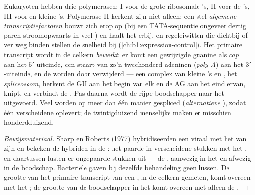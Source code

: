 \begin{proposition}\label{prop:b1:gene-expression:processing}
Eukaryoten hebben drie polymerasen: I voor de grote ribosomale 's, II voor de
's, III voor  en kleine 's. Polymerase II herkent
zijn  niet alleen: een stel \emph{algemene transcriptiefactoren} bouwt zich
erop op (bij een TATA-sequentie ongeveer dertig paren stroomopwaarts in veel )
en haalt het  erbij, en regeleiwitten die dichtbij of ver weg binden stellen
de snelheid bij (\cref{ch:b1:expression-control}). Het primaire transcript wordt in
de celkern \emph{bewerkt}: er komt een gewijzigde guanine als \emph{cap} aan het
$5'$-uiteinde, een staart van zo'n tweehonderd adeninen (\emph{poly-A}) aan het
$3'$-uiteinde, en de  worden door \emph{} verwijderd --- een
complex van kleine 's en , het \emph{spliceosoom}, herkent de GU aan het
begin van elk  en de AG aan het eind ervan, knipt, en verbindt de . Pas
daarna wordt de rijpe boodschapper naar het  uitgevoerd. Veel  worden
op meer dan één manier gespliced (\emph{alternatieve }), zodat één 
verscheidene  oplevert; de twintigduizend menselijke  maken er
misschien honderdduizend.
\end{proposition}
\begin{proof}[Bewijsmateriaal]
Sharp en Roberts (1977) hybridiseerden een viraal  met het  van
zijn  en bekeken de hybriden in de : het  paarde in
verscheidene stukken met het , en daartussen lusten er ongepaarde stukken 
uit --- de , aanwezig in het  en afwezig in de boodschap. Bacteriële
 gaven bij dezelfde behandeling geen lussen. De grootte van het primaire
transcript van een , in de celkern gemeten, komt overeen met het ; de grootte
van de boodschapper in het  komt overeen met alleen de .
\end{proof}

